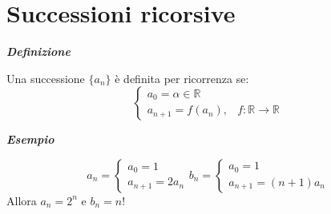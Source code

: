 \documentclass{article}
\theoremstyle{definition}
\begin{document}
\section{Successioni ricorsive}
\begin{center}
    \textbf{\textit{Definizione}}
\end{center}
    Una successione $\{a_n\}$ è definita per ricorrenza se:
    \begin{equation}
\begin{cases}
    a_0= \alpha \in \mathbb{R}\\
    a_{n+1}= f(a_n), & f: \mathbb{R} \to \mathbb{R}
\end{cases}
\end{equation}
\begin{center}
    \textbf{\textit{Esempio}}
\end{center}
    \begin{equation}
      a_n=  \begin{cases}
            a_0=1\\
            a_{n+1}=2a_{n}
        \end{cases}
        b_n=\begin{cases}
            a_0=1\\
            a_{n+1}=(n+1)a_n
        \end{cases}
    \end{equation}
    Allora $a_n=2^n$ e $b_n=n!$
\newpage
\end{document}
